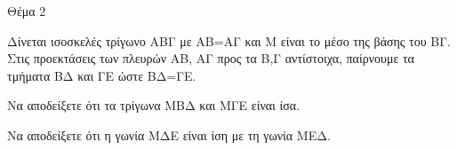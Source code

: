 
Θέμα 2

Δίνεται ισοσκελές τρίγωνο ΑΒΓ με ΑΒ=ΑΓ και Μ είναι το μέσο της βάσης του ΒΓ. Στις προεκτάσεις των πλευρών ΑΒ, ΑΓ προς τα Β,Γ αντίστοιχα, παίρνουμε τα τμήματα ΒΔ και ΓΕ ώστε ΒΔ=ΓΕ.

\begin{alist}
\item Να αποδείξετε ότι τα τρίγωνα ΜΒΔ και ΜΓΕ είναι ίσα. 

\item Να αποδείξετε ότι η γωνία ΜΔΕ είναι ίση με τη γωνία ΜΕΔ. 
\end{alist}
